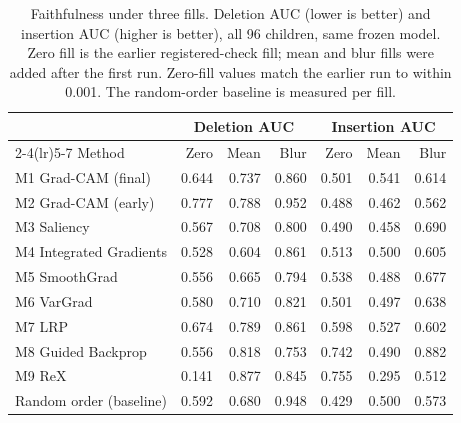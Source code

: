 \documentclass[11pt]{article}
\begin{document}
\begin{table}[H]
\centering
\caption{Faithfulness under three fills. Deletion AUC (lower is better) and insertion AUC (higher is better), all 96
children, same frozen model. Zero fill is the earlier registered-check fill; mean and blur fills were added after the
first run. Zero-fill values match the earlier run to within 0.001. The random-order baseline is
measured per fill.}
\label{tab:fills}
\small
\begin{tabular}{lrrrrrr}
\toprule
& \multicolumn{3}{c}{Deletion AUC} & \multicolumn{3}{c}{Insertion AUC} \\
\cmidrule(lr){2-4}\cmidrule(lr){5-7}
Method & Zero & Mean & Blur & Zero & Mean & Blur \\
\midrule
M1 Grad-CAM (final) & 0.644 & 0.737 & 0.860 & 0.501 & 0.541 & 0.614 \\
M2 Grad-CAM (early) & 0.777 & 0.788 & 0.952 & 0.488 & 0.462 & 0.562 \\
M3 Saliency & 0.567 & 0.708 & 0.800 & 0.490 & 0.458 & 0.690 \\
M4 Integrated Gradients & 0.528 & 0.604 & 0.861 & 0.513 & 0.500 & 0.605 \\
M5 SmoothGrad & 0.556 & 0.665 & 0.794 & 0.538 & 0.488 & 0.677 \\
M6 VarGrad & 0.580 & 0.710 & 0.821 & 0.501 & 0.497 & 0.638 \\
M7 LRP & 0.674 & 0.789 & 0.861 & 0.598 & 0.527 & 0.602 \\
M8 Guided Backprop & 0.556 & 0.818 & 0.753 & 0.742 & 0.490 & 0.882 \\
M9 ReX & 0.141 & 0.877 & 0.845 & 0.755 & 0.295 & 0.512 \\
\midrule
Random order (baseline) & 0.592 & 0.680 & 0.948 & 0.429 & 0.500 & 0.573 \\
\bottomrule
\end{tabular}
\end{table}
\end{document}
